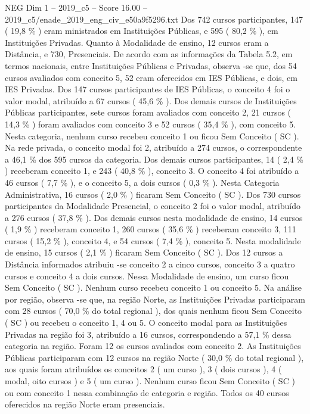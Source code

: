 \begin{textsample}{NEG Dim 1 – 2019\_c5 – Score 16.00 – 2019\_c5/enade\_2019\_eng\_civ\_e50a9f5296.txt}
Dos 742 cursos participantes, 147 ( 19,8 \% ) eram ministrados em Instituições Públicas, e 595 ( 80,2 \% ), em Instituições Privadas.
Quanto à Modalidade de ensino, 12 cursos eram a Distância, e 730, Presenciais.
De acordo com as informações da Tabela 5.2, em termos nacionais, entre Instituições Públicas e Privadas, observa -se que, dos 54 cursos avaliados com conceito 5, 52 eram oferecidos em IES Públicas, e dois, em IES Privadas.
Dos 147 cursos participantes de IES Públicas, o conceito 4 foi o valor modal, atribuído a 67 cursos ( 45,6 \% ).
Dos demais cursos de Instituições Públicas participantes, sete cursos foram avaliados com conceito 2, 21 cursos ( 14,3 \% ) foram avaliados com conceito 3 e 52 cursos ( 35,4 \% ), com conceito 5.
Nesta categoria, nenhum curso recebeu conceito 1 ou ficou Sem Conceito ( SC ).
Na rede privada, o conceito modal foi 2, atribuído a 274 cursos, o correspondente a 46,1 \% dos 595 cursos da categoria.
Dos demais cursos participantes, 14 ( 2,4 \% ) receberam conceito 1, e 243 ( 40,8 \% ), conceito 3.
O conceito 4 foi atribuído a 46 cursos ( 7,7 \% ), e o conceito 5, a dois cursos ( 0,3 \% ).
Nesta Categoria Administrativa, 16 cursos ( 2,0 \% ) ficaram Sem Conceito ( SC ).
Dos 730 cursos participantes da Modalidade Presencial, o conceito 2 foi o valor modal, atribuído a 276 cursos ( 37,8 \% ).
Dos demais cursos nesta modalidade de ensino, 14 cursos ( 1,9 \% ) receberam conceito 1, 260 cursos ( 35,6 \% ) receberam conceito 3, 111 cursos ( 15,2 \% ), conceito 4, e 54 cursos ( 7,4 \% ), conceito 5.
Nesta modalidade de ensino, 15 cursos ( 2,1 \% ) ficaram Sem Conceito ( SC ).
Dos 12 cursos a Distância informados atribuiu -se conceito 2 a cinco cursos, conceito 3 a quatro cursos e conceito 4 a dois cursos.
Nessa Modalidade de ensino, um curso ficou Sem Conceito ( SC ).
Nenhum curso recebeu conceito 1 ou conceito 5.
Na análise por região, observa -se que, na região Norte, as Instituições Privadas participaram com 28 cursos ( 70,0 \% do total regional ), dos quais nenhum ficou Sem Conceito ( SC ) ou recebeu o conceito 1, 4 ou 5.
O conceito modal para as Instituições Privadas na região foi 3, atribuído a 16 cursos, correspondendo a 57,1 \% dessa categoria na região.
Foram 12 os cursos avaliados com conceito 2.
As Instituições Públicas participaram com 12 cursos na região Norte ( 30,0 \% do total regional ), aos quais foram atribuídos os conceitos 2 ( um curso ), 3 ( dois cursos ), 4 ( modal, oito cursos ) e 5 ( um curso ).
Nenhum curso ficou Sem Conceito ( SC ) ou com conceito 1 nessa combinação de categoria e região.
Todos os 40 cursos oferecidos na região Norte eram presenciais.

\end{textsample}
